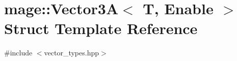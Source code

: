 \hypertarget{structmage_1_1_vector3_a}{}\section{mage\+:\+:Vector3A$<$ T, Enable $>$ Struct Template Reference}
\label{structmage_1_1_vector3_a}


{\ttfamily \#include $<$vector\+\_\+types.\+hpp$>$}

